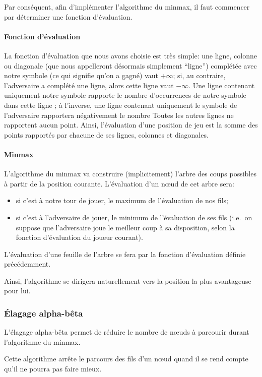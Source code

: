 Par conséquent, afin d'implémenter l'algorithme du minmax, il faut
commencer par déterminer une fonction d'évaluation.

\paragraph{Fonction d'évaluation}
La fonction d'évaluation que nous avons choisie est très simple: une
ligne, colonne ou diagonale (que nous appelleront désormais simplement
``ligne'') complétée avec notre symbole (ce qui signifie qu'on a
gagné) vaut $+\infty$; si, au contraire, l'adversaire a complété une
ligne, alors cette ligne vaut $-\infty$. Une ligne contenant
uniquement notre symbole rapporte le nombre d'occurrences de notre
symbole dans cette ligne ; à l'inverse, une ligne contenant uniquement
le symbole de l'adversaire rapportera négativement le nombre
Toutes les autres lignes ne rapportent aucun point.
Ainsi, l'évaluation d'une position de jeu est la somme des points
rapportés par chacune de ses lignes, colonnes et diagonales.

\paragraph{Minmax}
L'algorithme du minmax va construire (implicitement) l'arbre des coups
possibles à partir de la position courante.
L'évaluation d'un nœud de cet arbre sera:
\begin{itemize}
  \item si c'est à notre tour de jouer, le maximum de l'évaluation de nos fils;
  \item si c'est à l'adversaire de jouer, le minimum de l'évaluation
    de ses fils (i.e.\ on suppose que l'adversaire joue le meilleur
    coup à sa disposition, selon la fonction d'évaluation du joueur courant).
\end{itemize}

L'évaluation d'une feuille de l'arbre se fera par la fonction
d'évaluation définie précédemment.

Ainsi, l'algorithme se dirigera naturellement vers la position la plus
avantageuse pour lui.

\subsubsection{Élagage alpha-bêta}
L'élagage alpha-bêta permet de réduire le nombre de nœuds à parcourir durant
l'algorithme du minmax.

Cette algorithme arrête le parcours des fils d'un nœud quand il se rend
compte qu'il ne pourra pas faire mieux.

